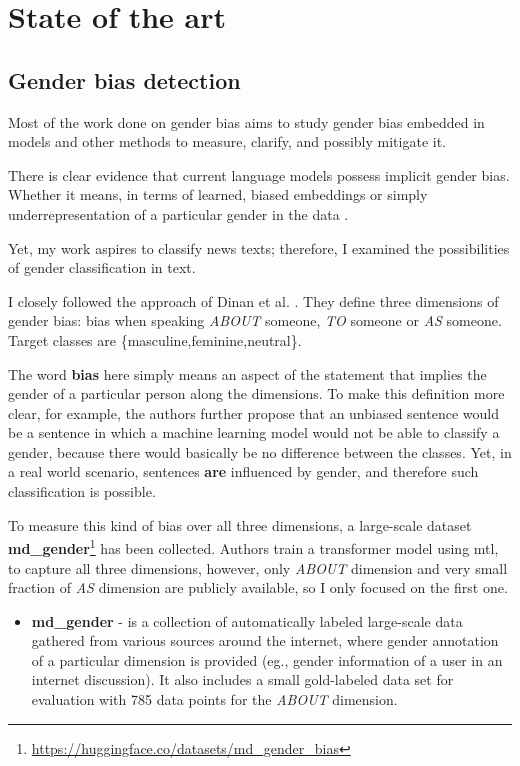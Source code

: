 \chapter{State of the art}

\section{Gender bias detection}\label{gender}
Most of the work done on gender bias aims to study gender bias embedded in models and other methods to measure, clarify, and possibly mitigate it.

There is clear evidence that current language models possess implicit gender bias. Whether it means, in terms of learned, biased embeddings \cite{bolukbasi2016man} or simply underrepresentation of a particular gender in the data \cite{sun-peng-2021-men}. 

Yet, my work aspires to classify news texts; therefore, I examined the possibilities of gender classification in text.

I closely followed the approach of Dinan et al. \cite{dinan2020multi}. They define three dimensions of gender bias: bias when speaking \textit{ABOUT} someone, \textit{TO} someone or \textit{AS} someone. Target classes are \{masculine,feminine,neutral\}. 

The word \textbf{bias} here simply means an aspect of the statement that implies the gender of a particular person along the dimensions. To make this definition more clear, for example, the authors further propose that an unbiased sentence would be a sentence in which a machine learning model would not be able to classify a gender, because there would basically be no difference between the classes. Yet, in a real world scenario, sentences \textbf{are} influenced by gender, and therefore such classification is possible.

To measure this kind of bias over all three dimensions, a large-scale dataset \textbf{md\_gender}\footnote{\url{https://huggingface.co/datasets/md_gender_bias}} has been collected. Authors train a transformer model using \Gls{mtl}, to capture all three dimensions, however, only \textit{ABOUT} dimension and very small fraction of \textit{AS} dimension are publicly available, so I only focused on the first one.

\begin{itemize}
\item \textbf{md\_gender} - is a collection of automatically labeled large-scale data gathered from various sources around the internet, where gender annotation of a particular dimension is provided (eg., gender information of a user in an internet discussion). It also includes a small gold-labeled data set for evaluation with 785 data points for the \textit{ABOUT} dimension.
\end{itemize}


